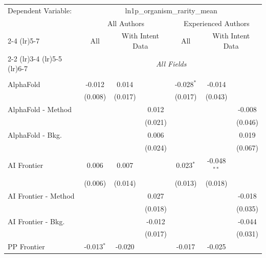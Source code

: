 \begingroup
\centering
\begin{tabular}{lcccccc}
   \tabularnewline \midrule \midrule
   Dependent Variable: & \multicolumn{6}{c}{ln1p\_organism\_rarity\_mean}\\
 & \multicolumn{3}{c}{All Authors} & \multicolumn{3}{c}{Experienced Authors} \\
\cmidrule(lr){2-4} \cmidrule(lr){5-7}
 & \multicolumn{1}{c}{All} & \multicolumn{2}{c}{With Intent Data} & \multicolumn{1}{c}{All} & \multicolumn{2}{c}{With Intent Data} \\
\cmidrule(lr){2-2} \cmidrule(lr){3-4} \cmidrule(lr){5-5} \cmidrule(lr){6-7}
 & \multicolumn{6}{c}{\textit{All Fields}} \\ \\
   AlphaFold            & -0.012       & 0.014   &               & -0.028$^{*}$ & -0.014        &   \\   
                        & (0.008)      & (0.017) &               & (0.017)      & (0.043)       &   \\   
   AlphaFold - Method   &              &         & 0.012         &              &               & -0.008\\   
                        &              &         & (0.021)       &              &               & (0.046)\\   
   AlphaFold - Bkg.     &              &         & 0.006         &              &               & 0.019\\   
                        &              &         & (0.024)       &              &               & (0.067)\\   
   AI Frontier          & 0.006        & 0.007   &               & 0.023$^{*}$  & -0.048$^{**}$ &   \\   
                        & (0.006)      & (0.014) &               & (0.013)      & (0.018)       &   \\   
   AI Frontier - Method &              &         & 0.027         &              &               & -0.018\\   
                        &              &         & (0.018)       &              &               & (0.035)\\   
   AI Frontier - Bkg.   &              &         & -0.012        &              &               & -0.044\\   
                        &              &         & (0.017)       &              &               & (0.031)\\   
   PP Frontier          & -0.013$^{*}$ & -0.020  &               & -0.017       & -0.025        &   \\   

\end{tabular}
